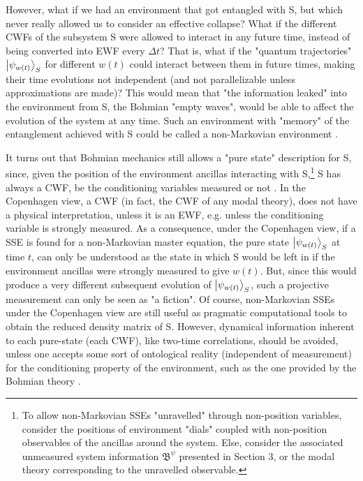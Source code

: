 \documentclass[11pt, a4paper]{article} %
\newcommand{\B}{\mathfrak{B}}
\begin{document}
However, what if we had an environment that got entangled with S, but which never really allowed us to consider an effective collapse? What if the different CWFs of the subsystem S were allowed to interact in any future time, instead of being converted into EWF every $\Delta t$? That is, what if the "quantum trajectories" $\ket{\psi_{w(t)}}_S$ for different $w(t)$ could interact between them in future times, making their time evolutions not independent (and not parallelizable unless approximations are made)? This would mean that "the information leaked" into the environment from S, the Bohmian "empty waves", would be able to affect the evolution of the system at any time. Such an environment with "memory" of the entanglement achieved with S could be called a non-Markovian environment \cite{MarkovianityDefs}. 

It turns out that Bohmian mechanics still allows a "pure state" description for S, since, given the position of the environment ancillas interacting with S,\footnote{To allow non-Markovian SSEs "unravelled" through non-position variables, consider the positions of environment "dials" coupled with non-position observables of the ancillas around the system. Else, consider the associated unmeasured system information $\B^\psi$ presented in Section 3, or the modal theory corresponding to the unravelled observable.} S has always a CWF, be the conditioning variables measured or not \cite{NMisModal, interpretSSE}. In the Copenhagen view, a CWF (in fact, the CWF of any modal theory), does not have a physical interpretation, unless it is an EWF, e.g. unless the conditioning variable is strongly measured. As a consequence, under the Copenhagen view, if a SSE is found for a non-Markovian master equation, the pure state $\ket{\psi_{w(t)}}_S$ at time $t$, can only be understood as the state in which S would be left in if the environment ancillas were strongly measured to give $w(t)$. But, since this would produce a very different subsequent evolution of $\ket{\psi_{w(t)}}_S$, such a projective measurement can only be seen as "a fiction". Of course, non-Markovian SSEs under the Copenhagen view are still useful as pragmatic computational tools to obtain the reduced density matrix of S. However, dynamical information inherent to each pure-state (each CWF), like two-time correlations, should be avoided, unless one accepts some sort of ontological reality (independent of measurement) for the conditioning property of the environment, such as the one provided by the Bohmian theory \cite{NMisModal, interpretSSE}.
\end{document}
